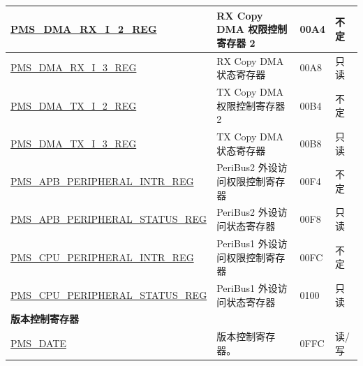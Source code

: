 \begin{longtable}{ |m{6cm} |m{7.2cm} | m{1.3cm} |m{1cm} | }
\hyperref[regdesc:PMSDMARXI2REG]{PMS\_DMA\_RX\_I\_2\_REG} & RX Copy DMA 权限控制寄存器 2 & \hexprefix{}00A4 & 不定 \\ \hline
\hyperref[regdesc:PMSDMARXI3REG]{PMS\_DMA\_RX\_I\_3\_REG} & RX Copy DMA 状态寄存器 & \hexprefix{}00A8 &只读 \\ \hline
\hyperref[regdesc:PMSDMATXI2REG]{PMS\_DMA\_TX\_I\_2\_REG} & TX Copy DMA 权限控制寄存器 2 & \hexprefix{}00B4 & 不定 \\ \hline
\hyperref[regdesc:PMSDMATXI3REG]{PMS\_DMA\_TX\_I\_3\_REG} & TX Copy DMA 状态寄存器 & \hexprefix{}00B8 &只读 \\ \hline
\hyperref[regdesc:PMSAPBPERIPHERALINTRREG]{PMS\_APB\_PERIPHERAL\_INTR\_REG} & PeriBus2 外设访问权限控制寄存器 & \hexprefix{}00F4 & 不定 \\ \hline
\hyperref[regdesc:PMSAPBPERIPHERALSTATUSREG]{PMS\_APB\_PERIPHERAL\_STATUS\_REG} & PeriBus2 外设访问状态寄存器 & \hexprefix{}00F8 &只读 \\ \hline
\hyperref[regdesc:PMSCPUPERIPHERALINTRREG]{PMS\_CPU\_PERIPHERAL\_INTR\_REG} & PeriBus1 外设访问权限控制寄存器 & \hexprefix{}00FC & 不定 \\ \hline
\hyperref[regdesc:PMSCPUPERIPHERALSTATUSREG]{PMS\_CPU\_PERIPHERAL\_STATUS\_REG} & PeriBus1 外设访问状态寄存器 & \hexprefix{}0100 &只读 \\ \hline
\multicolumn{4}{|l|}{\textbf{版本控制寄存器}} \\ \hline
\hyperref[regdesc:PMSDATEREG]{PMS\_DATE} & 版本控制寄存器。 & \hexprefix{}0FFC & 读/写 \\ \hline
\end{longtable}
